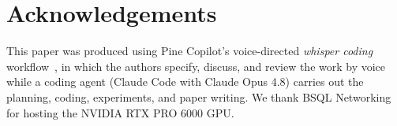 \documentclass[11pt]{article}
\begin{document}
\clearpage










\section*{Acknowledgements}

This paper was produced using Pine Copilot's voice-directed \emph{whisper coding} workflow~\citep{pineai2026whispercoding}, in which the authors specify, discuss, and review the work by voice while a coding agent (Claude Code with Claude Opus 4.8) carries out the planning, coding, experiments, and paper writing.
We thank BSQL Networking for hosting the NVIDIA RTX PRO 6000 GPU.





\end{document}

